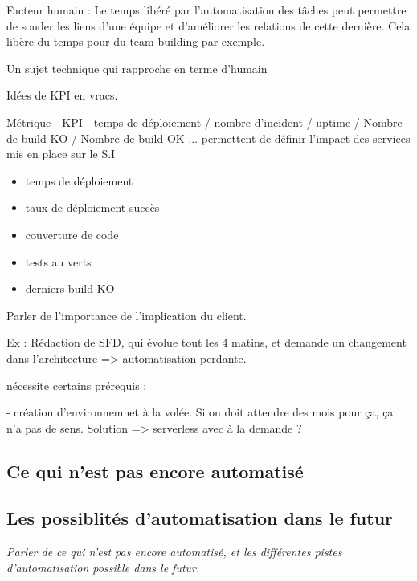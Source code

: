 Facteur humain : Le temps libéré par l'automatisation des tâches peut permettre de souder les liens d'une équipe et d'améliorer les relations de cette dernière. Cela libère du temps pour du team building par exemple.

Un sujet technique qui rapproche en terme d'humain

Idées de \gls{KPI} en vracs.

Métrique - KPI - temps de déploiement / nombre d'incident / uptime / Nombre de build KO / Nombre de build OK ... permettent de définir l'impact des services mis en place sur le S.I

\begin{itemize}
	\item temps de déploiement
	\item taux de déploiement succès
	\item couverture de code
	\item tests au verts
	\item derniers build KO
\end{itemize}

Parler de l'importance de l'implication du client. 

Ex :  Rédaction de SFD, qui évolue tout les 4 matins, et demande un changement dans l'architecture => automatisation perdante.

nécessite certains prérequis : 

- création d'environnemnet à la volée. Si on doit attendre des mois pour ça, ça n'a pas de sens. Solution => serverless avec à la demande ? 

\subsection*{Ce qui n'est pas encore automatisé}

\subsection*{Les possiblités d'automatisation dans le futur}

\textit{Parler de ce qui n'est pas encore automatisé, et les différentes pistes d'automatisation possible dans le futur.}


